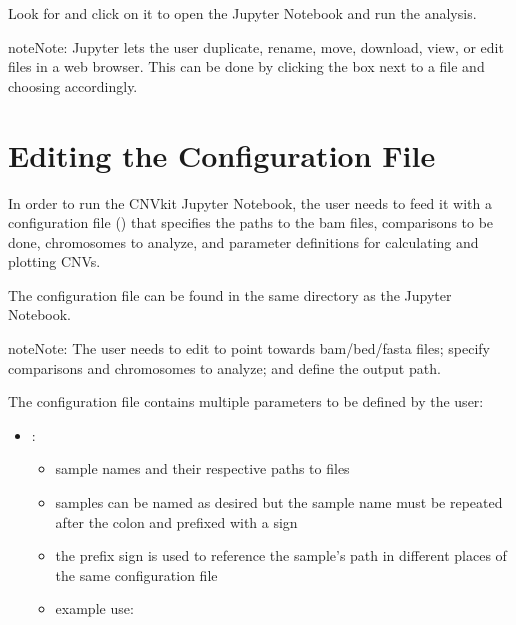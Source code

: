 \documentclass[letterpaper,10pt,english]{sphinxhowto}
\begin{document}
\sphinxAtStartPar
Look for  and click on it to open the Jupyter Notebook and run the analysis.

\begin{sphinxadmonition}{note}{Note:}
\sphinxAtStartPar
Jupyter lets the user duplicate, rename, move, download, view, or edit files in a web browser. This can be done by clicking the box next to a file and choosing accordingly.
\end{sphinxadmonition}


\section{Editing the Configuration File}
\label{\detokenize{index:editing-the-configuration-file}}
\sphinxAtStartPar
In order to run the CNVkit Jupyter Notebook, the user needs to feed it with a configuration file () that specifies the paths to the bam files, comparisons to be done, chromosomes to analyze, and parameter definitions for calculating and plotting CNVs.

\sphinxAtStartPar
The configuration file  can be found in the same directory as the Jupyter Notebook.

\begin{sphinxadmonition}{note}{Note:}
\sphinxAtStartPar
The user needs to edit  to point towards bam/bed/fasta files; specify comparisons and chromosomes to analyze; and define the output path.
\end{sphinxadmonition}

\sphinxAtStartPar
The configuration file  contains multiple parameters to be defined by the user:
\begin{itemize}
\item {} 
\sphinxAtStartPar
{}:
\begin{itemize}
\item {} 
\sphinxAtStartPar
sample names and their respective paths to  files

\item {} 
\sphinxAtStartPar
samples can be named as desired but the sample name must be repeated after the colon and prefixed with a \sphinxtitleref{\&} sign

\item {} 
\sphinxAtStartPar
the \sphinxtitleref{\&} prefix sign is used to reference the sample’s path in different places of the same configuration file

\item {} 
\sphinxAtStartPar
example use:

\end{itemize}

\end{itemize}
\end{document}
